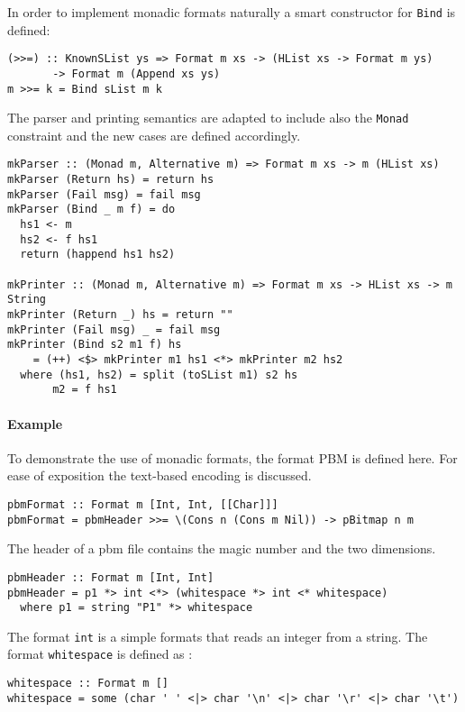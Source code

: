 \documentclass[../Thesis.tex]{subfiles}
\begin{document}
In order to implement monadic formats naturally a smart constructor for \texttt{Bind} is defined:
\begin{verbatim}
(>>=) :: KnownSList ys => Format m xs -> (HList xs -> Format m ys) 
       -> Format m (Append xs ys)
m >>= k = Bind sList m k
\end{verbatim}

The parser and printing semantics are adapted to include also the \texttt{Monad} constraint and the new cases are defined accordingly.
\begin{verbatim}
mkParser :: (Monad m, Alternative m) => Format m xs -> m (HList xs)
mkParser (Return hs) = return hs
mkParser (Fail msg) = fail msg
mkParser (Bind _ m f) = do
  hs1 <- m
  hs2 <- f hs1
  return (happend hs1 hs2)

mkPrinter :: (Monad m, Alternative m) => Format m xs -> HList xs -> m String
mkPrinter (Return _) hs = return ""
mkPrinter (Fail msg) _ = fail msg
mkPrinter (Bind s2 m1 f) hs 
    = (++) <$> mkPrinter m1 hs1 <*> mkPrinter m2 hs2
  where (hs1, hs2) = split (toSList m1) s2 hs
       m2 = f hs1 
\end{verbatim}

\paragraph{Example}
To demonstrate the use of monadic formats, the format PBM is defined here.
For ease of exposition the text-based encoding is discussed.

\begin{verbatim}
pbmFormat :: Format m [Int, Int, [[Char]]]
pbmFormat = pbmHeader >>= \(Cons n (Cons m Nil)) -> pBitmap n m
\end{verbatim}

The header of a pbm file contains the magic number and the two dimensions.

\begin{verbatim}
pbmHeader :: Format m [Int, Int]
pbmHeader = p1 *> int <*> (whitespace *> int <* whitespace)
  where p1 = string "P1" *> whitespace 
\end{verbatim}

The format \texttt{int} is a simple formats that reads an integer from a string.
The format \texttt{whitespace} is defined as :
\begin{verbatim}
whitespace :: Format m []
whitespace = some (char ' ' <|> char '\n' <|> char '\r' <|> char '\t')
\end{verbatim}
\end{document}
